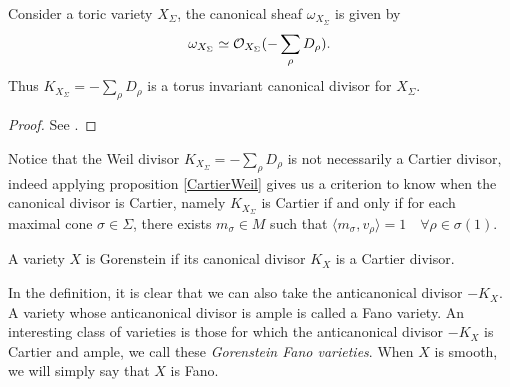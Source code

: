 \documentclass[../main.tex]{subfiles}
\begin{document}
\begin{theorem} \label{CanDiv}
     Consider a toric variety $X_\Sigma$, the canonical sheaf $\omega_{X_\Sigma}$ is given by
     \begin{equation*}
\omega_{X_\Sigma} \simeq  \mathcal{O}_{X_\Sigma} ( -\sum_\rho D_\rho ).
     \end{equation*}
Thus $K_{X_\Sigma} = - \sum_\rho D_\rho$ is a torus invariant canonical divisor for $X_\Sigma$.
\end{theorem}
\begin{proof} See \cite[Thm 8.2.3]{CLS11}.
\end{proof}

Notice that the Weil divisor $K_{X_\Sigma} = - \sum_\rho D_\rho$ is not necessarily a Cartier divisor, indeed applying proposition \ref{CartierWeil} gives us a criterion to know when the canonical divisor is Cartier, namely  $K_{X_\Sigma}$ is Cartier if and only if for each maximal cone $\sigma \in \Sigma$, there exists $m_\sigma \in M$ such that $\langle m_\sigma, v_\rho \rangle = 1 \quad \forall \rho \in \sigma(1)$.
\begin{defn}
    A variety $X$ is Gorenstein if its canonical divisor $K_{X}$ is a Cartier divisor.
\end{defn}
In the definition, it is clear that we can also take the anticanonical divisor $-K_{X}$.
A variety whose anticanonical divisor is ample is called a Fano variety.
An interesting class of varieties is those for which the anticanonical divisor $-K_{X}$ is Cartier and
ample, we call these \emph{Gorenstein Fano varieties}. When $X$ is smooth, we will simply say that $X$ is Fano.
\end{document}
